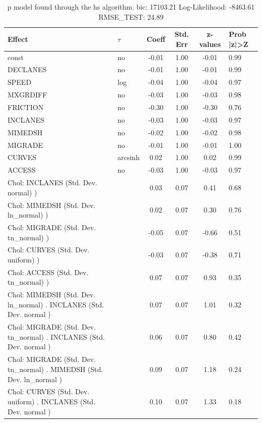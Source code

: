 \begin{table}
	\caption{p model found through the hs algorithm. bic: 17103.21 Log-Likelihood: -8463.61 RMSE_TEST: 24.89}
	\begin{center}
		\begin{tabular}{|l|l|c|c|c|l|}
			\hline
			Effect & $\tau$ & Coeff & Std. Err & z-values & Prob |z|>Z \\
			\hline
			const & no & -0.01 & 1.00 & -0.01 & 0.99 \\
			\hline
			DECLANES & no & -0.01 & 1.00 & -0.01 & 0.99 \\
			\hline
			SPEED & log & -0.04 & 1.00 & -0.04 & 0.97 \\
			\hline
			MXGRDIFF & no & -0.03 & 1.00 & -0.03 & 0.98 \\
			\hline
			FRICTION & no & -0.30 & 1.00 & -0.30 & 0.76 \\
			\hline
			INCLANES & no & -0.03 & 1.00 & -0.03 & 0.97 \\
			\hline
			MIMEDSH & no & -0.02 & 1.00 & -0.02 & 0.98 \\
			\hline
			MIGRADE & no & -0.01 & 1.00 & -0.01 & 1.00 \\
			\hline
			CURVES & arcsinh & 0.02 & 1.00 & 0.02 & 0.99 \\
			\hline
			ACCESS & no & -0.03 & 1.00 & -0.03 & 0.97 \\
			\hline
			 Chol: INCLANES (Std. Dev. normal) ) &  & 0.03 & 0.07 & 0.41 & 0.68 \\
			\hline
			 Chol: MIMEDSH (Std. Dev. ln_normal) ) &  & 0.02 & 0.07 & 0.30 & 0.76 \\
			\hline
			 Chol: MIGRADE (Std. Dev. tn_normal) ) &  & -0.05 & 0.07 & -0.66 & 0.51 \\
			\hline
			 Chol: CURVES (Std. Dev. uniform) ) &  & -0.03 & 0.07 & -0.38 & 0.71 \\
			\hline
			 Chol: ACCESS (Std. Dev. tn_normal) ) &  & 0.07 & 0.07 & 0.93 & 0.35 \\
			\hline
			 Chol: MIMEDSH (Std. Dev. ln_normal) . INCLANES (Std. Dev.   normal ) &  & 0.07 & 0.07 & 1.01 & 0.32 \\
			\hline
			 Chol: MIGRADE (Std. Dev. tn_normal) . INCLANES (Std. Dev.   normal ) &  & 0.06 & 0.07 & 0.80 & 0.42 \\
			\hline
			 Chol: MIGRADE (Std. Dev. tn_normal) . MIMEDSH (Std. Dev.   ln_normal ) &  & 0.09 & 0.07 & 1.18 & 0.24 \\
			\hline
			 Chol: CURVES (Std. Dev. uniform) . INCLANES (Std. Dev.   normal ) &  & 0.10 & 0.07 & 1.33 & 0.18 \\

\end{tabular}
\end{center}
\end{table}
